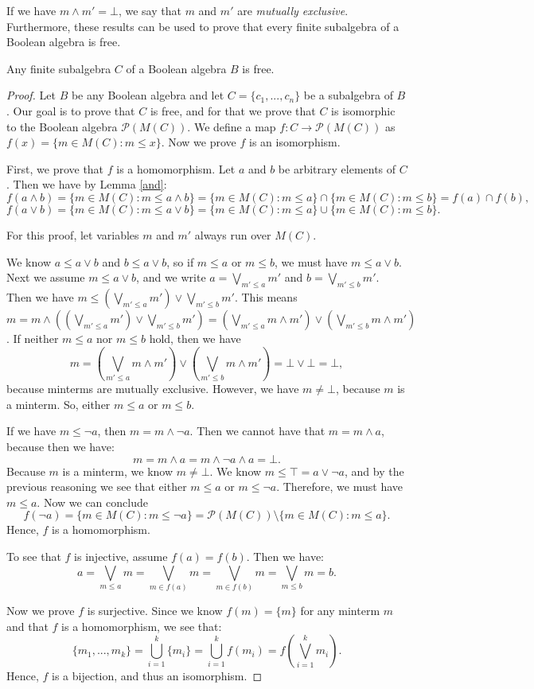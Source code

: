 If we have $m \land m' = \bot$, we say that $m$ and $m'$ are \emph{mutually exclusive}. Furthermore, these results can be used to prove that every finite subalgebra of a Boolean algebra is free.

\begin{proposition}
\label{finite-free-sub-is-free}
Any finite subalgebra $C$ of a Boolean algebra $B$ is free.
\end{proposition}

\begin{proof}
Let $B$ be any Boolean algebra and let $C = \{c_1, ..., c_n\}$ be a subalgebra of $B$. Our goal is to prove that $C$ is free, and for that we prove that $C$ is isomorphic to the Boolean algebra $\mathcal{P}(M(C))$. We define a map $f : C \rightarrow \mathcal{P}(M(C))$ as $f(x) = \{m \in M(C) : m \leq x\}$. Now we prove $f$ is an isomorphism. 

First, we prove that $f$ is a homomorphism. Let $a$ and $b$ be arbitrary elements of $C$. Then we have by Lemma \ref{and}:
\[f(a \land b) = \{m \in M(C) : m \leq a \land b\} = \{m \in M(C) : m \leq a\} \cap \{m \in M(C) : m \leq b\} = f(a) \cap f(b),\]
\[f(a \lor b) = \{m \in M(C) : m \leq a \lor b \} = \{m \in M(C) : m \leq a\} \cup \{m \in M(C) : m \leq b\}.\]

For this proof, let variables $m$ and $m'$ always run over $M(C)$.

We know $a \leq a \lor b$ and $b \leq a \lor b$, so if $m \leq a$ or $m \leq b$, we must have $m \leq a \lor b$. Next we assume $m \leq a \lor b$, and we write $a = \bigvee_{m' \le a} m'$ and $b = \bigvee_{m' \leq b} m'$. Then we have $m \le (\bigvee_{m' \leq a} m') \lor \bigvee_{m' \leq b} m'$. This means $m = m \land ((\bigvee_{m' \leq a} m') \lor \bigvee_{m' \leq b} m') = (\bigvee_{m' \leq a} m \land m') \lor (\bigvee_{m' \leq b} m \land m')$. If neither $m \leq a$ nor $m \leq b$ hold, then we have
\[m = (\bigvee_{m' \leq a} m \land m') \lor (\bigvee_{m' \leq b} m \land m') = \bot \lor \bot = \bot,\]
because minterms are mutually exclusive. However, we have $m \neq \bot$, because $m$ is a minterm. So, either $m \leq a$ or $m \leq b$.

If we have $m \leq \neg a$, then $m=m \land \neg a$. Then we cannot have that $m=m \land a$, because then we have:
\[m=m \land a = m \land \neg a \land a = \bot.\]
Because $m$ is a minterm, we know $m \neq \bot$. We know $m \leq \top = a \lor \neg a$, and by the previous reasoning we see that either $m \leq a$ or $m \leq \neg a$. Therefore, we must have $m \leq a$. Now we can conclude
\[f(\neg a) = \{m \in M(C) : m \leq \neg a\} =  \mathcal{P}(M(C)) \setminus \{m \in M(C) : m \leq a\}.\]
Hence, $f$ is a homomorphism.

To see that $f$ is injective, assume $f(a) = f(b)$. Then we have:
\[a = \bigvee_{m \leq a} m = \bigvee_{m \in f(a)} m = \bigvee_{m \in f(b)} m = \bigvee_{m \le b} m = b.\]

Now we prove $f$ is surjective. Since we know $f(m) = \{m\}$ for any minterm $m$ and that $f$ is a homomorphism, we see that:
\[\{m_1, ..., m_k\} = \bigcup_{i=1}^k \{m_i\} = \bigcup_{i=1}^k f(m_i) = f(\bigvee_{i=1}^km_i).\]
Hence, $f$ is a bijection, and thus an isomorphism.
\end{proof}

